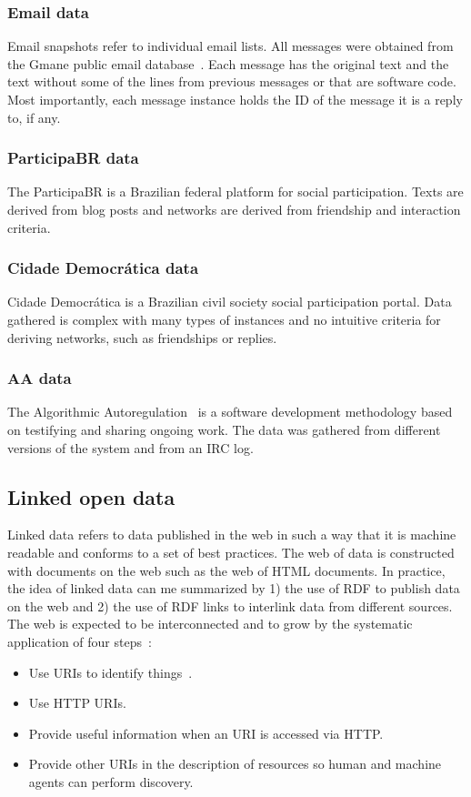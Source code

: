 \subsubsection{Email data}
Email snapshots refer to individual email lists.
All messages were obtained from the Gmane public email database~\cite{gmane}.
Each message has the original text and the text without some of the lines
from previous messages or that are software code.
Most importantly, each message instance holds the ID of the message it is
a reply to, if any.

\subsubsection{ParticipaBR data}
The ParticipaBR is a Brazilian federal platform for social participation.
Texts are derived from blog posts and networks are derived from
friendship and interaction criteria.


\subsubsection{Cidade Democr\'atica data}
Cidade Democr\'atica is a Brazilian civil society social participation portal.
Data gathered is complex with many types of instances and no intuitive criteria
for deriving networks, such as friendships or replies.

\subsubsection{AA data}
The Algorithmic Autoregulation~\cite{aa} is a software development
methodology based on testifying and sharing ongoing work.
The data was gathered from different versions of the system and from an IRC
log.

\subsection{Linked open data}
Linked data refers to data published in the web in such a way that it is
machine readable and conforms to a set of best practices.
The web of data is constructed with documents on the web 
such as the web of HTML documents.
In practice, the idea of linked data can me summarized
by 1) the use of RDF to publish data on the web and 2) the use of RDF
links to interlink data from different sources.
The web is expected to be interconnected and to grow by the systematic application of four
steps~\cite{lee1}:
\begin{itemize}
	\item Use URIs to identify things~\cite{uri}.
	\item Use HTTP URIs.
	\item Provide useful information when an URI is accessed via HTTP.
	\item Provide other URIs in the description of resources so human
		and machine agents can perform discovery.
\end{itemize}

